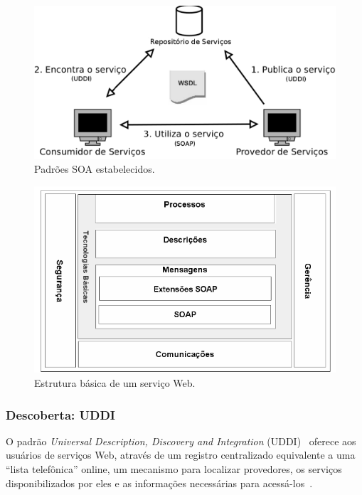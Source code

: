 \documentclass[12pt]{report} %
\begin{document}
	    \begin{figure}[!htb]
	    \begin{center}
		\includegraphics[scale=0.50]{imagens/SOA.pdf} 
		\caption{Padrões SOA estabelecidos.}
		\label{fig:SOA}
	    \end{center}
	    \end{figure}

	    \begin{figure}[!htb]
	    \begin{center}
		\includegraphics[scale=0.60]{imagens/ws.png} 
		\caption{Estrutura básica de um serviço Web.}
		\label{fig:WS}
	    \end{center}
	    \end{figure}             

	    \subsubsection{Descoberta: UDDI}
	    \label{subsec:UDDI}
		O padrão \textit{Universal Description, Discovery and Integration} (UDDI)~\cite{UDDI:website} oferece aos usuários de serviços Web, através de um registro centralizado equivalente a uma  ``lista telefônica'' online, um mecanismo para localizar provedores, os serviços disponibilizados por eles e as informações necessárias para acessá-los~\cite{IntroWS}.
		
\end{document}
